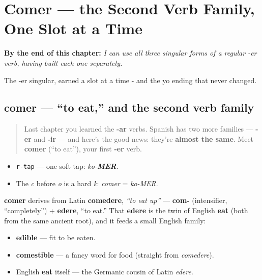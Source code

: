 
\chapter{Comer --- the Second Verb Family, One Slot at a Time}
\label{ch:spanish-comer}

\begin{chapteropening}
\textbf{By the end of this chapter:} \emph{I can use all three singular forms of a regular -er verb, having built each one separately.}

The -er singular, earned a slot at a time - and the yo ending that never changed.
\end{chapteropening}

\section[comer]{comer — \textquotedblleft{}to eat,\textquotedblright{} and the second verb family}

\label{lesson:ES-C07-comer}



\begin{quote}
Last chapter you learned the \textbf{-ar} verbs. Spanish has two more families — \textbf{-er} and \textbf{-ir} — and here's the good news: they're \textbf{almost the same}. Meet \textbf{comer} (\textquotedblleft{}to eat\textquotedblright{}), your first \textbf{-er} verb.
\end{quote}

\begin{sounds}
\begin{itemize}
\raggedright
  \item \texttt{r-tap} — one soft tap: \emph{ko-\textbf{MER}}.
  \item The \emph{c} before \emph{o} is a hard \emph{k}: \emph{comer} = \emph{ko-MER}.
\end{itemize}
\end{sounds}

\begin{cousinweb}
\textbf{comer} derives from Latin \textbf{comedere}, \emph{\textquotedblleft{}to eat up\textquotedblright{}} — \textbf{com-} (intensifier, \textquotedblleft{}completely\textquotedblright{}) + \textbf{edere}, \textquotedblleft{}to eat.\textquotedblright{} That \textbf{edere} is the twin of English \textbf{eat} (both from the same ancient root), and it feeds a small English family:

\begin{itemize}
\raggedright
  \item \textbf{edible} — fit to be eaten.
  \item \textbf{comestible} — a fancy word for food (straight from \emph{comedere}).
  \item English \textbf{eat} itself — the Germanic cousin of Latin \emph{edere}.
\end{itemize}
\end{cousinweb}

